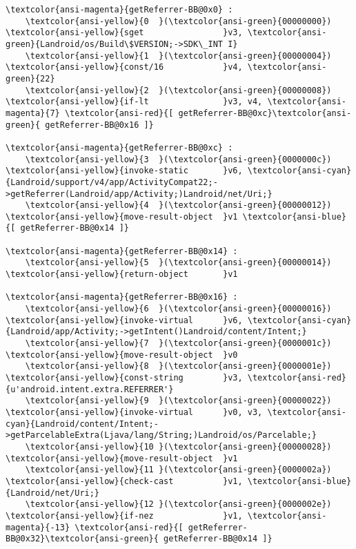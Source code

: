 \documentclass[11pt]{article}
\begin{document}
    \begin{Verbatim}[commandchars=\\\{\}]
\textcolor{ansi-magenta}{getReferrer-BB@0x0} : 
	\textcolor{ansi-yellow}{0  }(\textcolor{ansi-green}{00000000}) \textcolor{ansi-yellow}{sget                }v3, \textcolor{ansi-green}{Landroid/os/Build\$VERSION;->SDK\_INT I}
	\textcolor{ansi-yellow}{1  }(\textcolor{ansi-green}{00000004}) \textcolor{ansi-yellow}{const/16            }v4, \textcolor{ansi-green}{22}
	\textcolor{ansi-yellow}{2  }(\textcolor{ansi-green}{00000008}) \textcolor{ansi-yellow}{if-lt               }v3, v4, \textcolor{ansi-magenta}{7} \textcolor{ansi-red}{[ getReferrer-BB@0xc}\textcolor{ansi-green}{ getReferrer-BB@0x16 ]}

\textcolor{ansi-magenta}{getReferrer-BB@0xc} : 
	\textcolor{ansi-yellow}{3  }(\textcolor{ansi-green}{0000000c}) \textcolor{ansi-yellow}{invoke-static       }v6, \textcolor{ansi-cyan}{Landroid/support/v4/app/ActivityCompat22;->getReferrer(Landroid/app/Activity;)Landroid/net/Uri;}
	\textcolor{ansi-yellow}{4  }(\textcolor{ansi-green}{00000012}) \textcolor{ansi-yellow}{move-result-object  }v1 \textcolor{ansi-blue}{[ getReferrer-BB@0x14 ]}

\textcolor{ansi-magenta}{getReferrer-BB@0x14} : 
	\textcolor{ansi-yellow}{5  }(\textcolor{ansi-green}{00000014}) \textcolor{ansi-yellow}{return-object       }v1

\textcolor{ansi-magenta}{getReferrer-BB@0x16} : 
	\textcolor{ansi-yellow}{6  }(\textcolor{ansi-green}{00000016}) \textcolor{ansi-yellow}{invoke-virtual      }v6, \textcolor{ansi-cyan}{Landroid/app/Activity;->getIntent()Landroid/content/Intent;}
	\textcolor{ansi-yellow}{7  }(\textcolor{ansi-green}{0000001c}) \textcolor{ansi-yellow}{move-result-object  }v0
	\textcolor{ansi-yellow}{8  }(\textcolor{ansi-green}{0000001e}) \textcolor{ansi-yellow}{const-string        }v3, \textcolor{ansi-red}{u'android.intent.extra.REFERRER'}
	\textcolor{ansi-yellow}{9  }(\textcolor{ansi-green}{00000022}) \textcolor{ansi-yellow}{invoke-virtual      }v0, v3, \textcolor{ansi-cyan}{Landroid/content/Intent;->getParcelableExtra(Ljava/lang/String;)Landroid/os/Parcelable;}
	\textcolor{ansi-yellow}{10 }(\textcolor{ansi-green}{00000028}) \textcolor{ansi-yellow}{move-result-object  }v1
	\textcolor{ansi-yellow}{11 }(\textcolor{ansi-green}{0000002a}) \textcolor{ansi-yellow}{check-cast          }v1, \textcolor{ansi-blue}{Landroid/net/Uri;}
	\textcolor{ansi-yellow}{12 }(\textcolor{ansi-green}{0000002e}) \textcolor{ansi-yellow}{if-nez              }v1, \textcolor{ansi-magenta}{-13} \textcolor{ansi-red}{[ getReferrer-BB@0x32}\textcolor{ansi-green}{ getReferrer-BB@0x14 ]}


\end{Verbatim}
\end{document}
